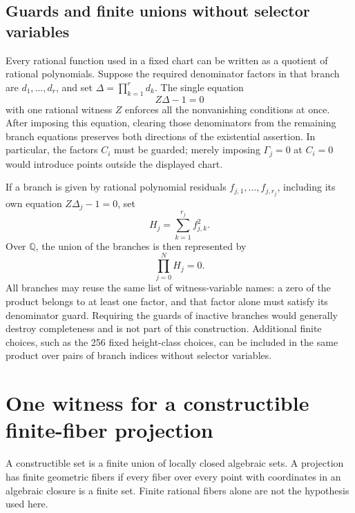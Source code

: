\documentclass[11pt]{article}
\theoremstyle{definition}
\begin{document}
\subsection{Guards and finite unions without selector variables}

Every rational function used in a fixed chart can be written as a
quotient of rational polynomials.  Suppose the required denominator
factors in that branch are $d_1,\ldots,d_r$, and set
$\Delta=\prod_{k=1}^r d_k$.  The single equation
\[
 Z\Delta-1=0
\]
with one rational witness $Z$ enforces all the nonvanishing conditions
at once.  After imposing this equation, clearing those denominators
from the remaining branch equations preserves both directions of
the existential assertion.  In particular, the factors $C_i$ must
be guarded; merely imposing $\Gamma_j=0$ at $C_i=0$ would introduce
points outside the displayed chart.

If a branch is given by rational polynomial residuals
$f_{j,1},\ldots,f_{j,r_j}$, including its own equation
$Z\Delta_j-1=0$, set
\[
 H_j=\sum_{k=1}^{r_j}f_{j,k}^2.
\]
Over $\mathbb Q$, the union of the branches is then represented by
\[
 \prod_{j=0}^{N}H_j=0.
\]
All branches may reuse the same list of witness-variable names: a
zero of the product belongs to at least one factor, and that factor
alone must satisfy its denominator guard.  Requiring the guards of
inactive branches would generally destroy completeness and is not
part of this construction.  Additional finite choices, such as the
256 fixed height-class choices, can be included in the same product
over pairs of branch indices without selector variables.



\section{One witness for a constructible finite-fiber projection}
\label{sec:one-finite-variable}
A constructible set is a finite union of locally closed algebraic sets.
A projection has finite geometric fibers if every fiber over every
point with coordinates in an algebraic closure is a finite set.
Finite rational fibers alone are not the hypothesis used here.
\end{document}
